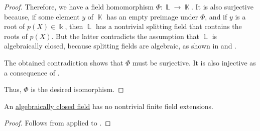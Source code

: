 \begin{proof}
  Therefore, we have a field homomorphism \( \Phi: \BbbL \to \BbbK \). It is also surjective because, if some element \( y \) of \( \BbbK \) has an empty preimage under \( \Phi \), and if \( y \) is a root of \( p(X) \in \Bbbk \), then \( \BbbL \) has a nontrivial splitting field that contains the roots of \( p(X) \). But the latter contradicts the assumption that \( \BbbL \) is algebraically closed, because splitting fields are algebraic, as shown in  and .

  The obtained contradiction shows that \( \Phi \) must be surjective. It is also injective as a consequence of .

  Thus, \( \Phi \) is the desired isomorphism.
\end{proof}

\begin{proposition}\label{thm:no_finite_extensions_of_closed_fields}
  An \hyperref[def:algebraically_closed_field]{algebraically closed field} has no nontrivial finite field extensions.
\end{proposition}
\begin{proof}
  Follows from  applied to .
\end{proof}
